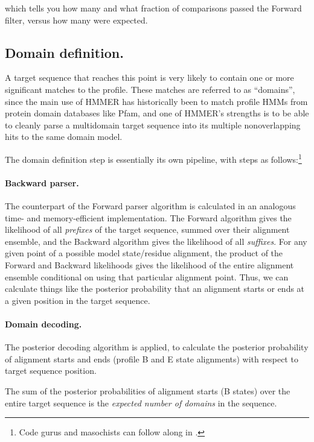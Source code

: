 which tells you how many and what fraction of comparisons passed the
Forward filter, versus how many were expected.


\subsection{Domain definition.}

A target sequence that reaches this point is very likely to contain
one or more significant matches to the profile. These matches are
referred to as ``domains'', since the main use of HMMER has
historically been to match profile HMMs from protein domain databases
like Pfam, and one of HMMER's strengths is to be able to cleanly parse
a multidomain target sequence into its multiple nonoverlapping hits to
the same domain model.

The domain definition step is essentially its own pipeline, with steps
as follows:\footnote{Code gurus and masochists can follow along in 
.}

\paragraph{Backward parser.}
The counterpart of the Forward parser algorithm is calculated in an
analogous time- and memory-efficient implementation. The Forward
algorithm gives the likelihood of all \emph{prefixes} of the target
sequence, summed over their alignment ensemble, and the Backward
algorithm gives the likelihood of all \emph{suffixes}. For any given
point of a possible model state/residue alignment, the product of the
Forward and Backward likelihoods gives the likelihood of the entire
alignment ensemble conditional on using that particular alignment
point. Thus, we can calculate things like the posterior probability
that an alignment starts or ends at a given position in the target
sequence.

\paragraph{Domain decoding.}
The posterior decoding algorithm is applied, to calculate the
posterior probability of alignment starts and ends (profile B and E
state alignments) with respect to target sequence position.

The sum of the posterior probabilities of alignment starts (B states)
over the entire target sequence is the \emph{expected number of
  domains} in the sequence.

